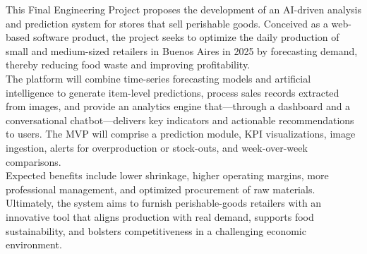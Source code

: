 \begin{Abstract}

    \indent This Final Engineering Project proposes the development of an AI-driven analysis and prediction system for stores that sell perishable goods. Conceived as a web-based software product, the project seeks to optimize the daily production of small and medium-sized retailers in Buenos Aires in 2025 by forecasting demand, thereby reducing food waste and improving profitability.\\

    \indent The platform will combine time-series forecasting models and artificial intelligence to generate item-level predictions, process sales records extracted from images, and provide an analytics engine that—through a dashboard and a conversational chatbot—delivers key indicators and actionable recommendations to users. The MVP will comprise a prediction module, KPI visualizations, image ingestion, alerts for overproduction or stock-outs, and week-over-week comparisons.\\
    
    \indent Expected benefits include lower shrinkage, higher operating margins, more professional management, and optimized procurement of raw materials. Ultimately, the system aims to furnish perishable-goods retailers with an innovative tool that aligns production with real demand, supports food sustainability, and bolsters competitiveness in a challenging economic environment.

\end{Abstract}